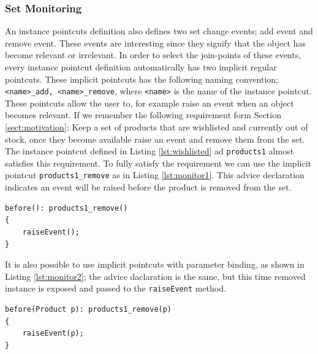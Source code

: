 \documentclass{llncs}
\begin{document}
\subsubsection{Set Monitoring}
An instance pointcuts definition also defines two set change events; add event and remove event. These events are interesting since they signify that the object has become relevant or irrelevant. In order to select the join-points of these events, every instance pointcut definition automatically has two implicit regular pointcuts. These implicit pointcuts has the following naming convention; \lstinline!<name>_add, <name>_remove!, where \texttt{<name>} is the name of the instance pointcut. These pointcuts allow the user to, for example raise an event when an object becomes relevant. If we remember the following requirement form Section \ref{sect:motivation}; \textsf{Keep a set of products that are wishlisted and currently out of stock,  once they become available raise an event and remove them from the set}. The instance pointcut defined in Listing \ref{lst:wishlisted} ad \texttt{products1} almost satisfies this requirement. To fully satisfy the requirement we can use the implicit pointcut \texttt{products1_remove} as in Listing \ref{lst:monitor1}. This advice declaration indicates an event will be raised before the product is removed from the set. 
\begin{lstlisting}[float=h!, caption={Implicit remove pointcut used with an advice}, label={lst:monitor1}]
before(): products1_remove()
{
	raiseEvent();
}
\end{lstlisting}
It is also possible to use implicit pointcuts with parameter binding, as shown in Listing \ref{lst:monitor2}; the advice daclaration is the same, but this time removed instance is exposed and passed to the \texttt{raiseEvent} method.
\begin{lstlisting}[float=h!, caption={Implicit remove pointcut with parameter binding used with an advice}, label={lst:monitor2}]
before(Product p): products1_remove(p)
{
	raiseEvent(p);
}
\end{lstlisting}
\end{document}
